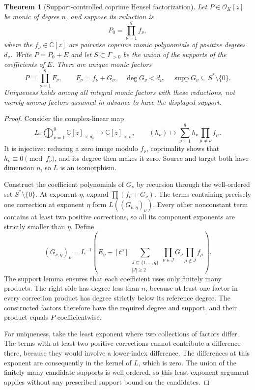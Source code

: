 \documentclass[11pt,letterpaper,oneside]{article}
\numberwithin{equation}{section}
\newtheorem{theorem}{Theorem}[section]
\theoremstyle{definition}
\theoremstyle{remark}\newtheorem{remark}[theorem]{Remark}
\newcommand{\C}{\mathbb C}\newcommand{\R}{\mathbb R}\newcommand{\Q}{\mathbb Q}
\newcommand{\OO}{\mathcal O}\newcommand{\mm}{\mathfrak m}
\newcommand{\supp}{\operatorname{supp}}\newcommand{\st}{\operatorname{st}}
\begin{document}
\begin{theorem}[Support-controlled coprime Hensel factorization]\label{thm:hensel}
Let $P\in\OO_K[z]$ be monic of degree $n$, and suppose its reduction is
\[
 P_0=\prod_{\nu=1}^q f_\nu,
\]
where the $f_\nu\in\C[z]$ are pairwise coprime monic polynomials of
positive degrees $d_\nu$. Write $P=P_0+E$ and let $S\subset\Gamma_{>0}$
be the union of the supports of the coefficients of $E$.
There are unique monic factors
\begin{equation}\label{eq:henselfactors}
 P=\prod_{\nu=1}^q F_\nu,\qquad
 F_\nu=f_\nu+G_\nu,\quad \deg G_\nu<d_\nu,
 \quad \supp G_\nu\subseteq S^*\setminus\{0\}.
\end{equation}
Uniqueness holds among all integral monic factors with these reductions,
not merely among factors assumed in advance to have the displayed support.
\end{theorem}
\begin{proof}
Consider the complex-linear map
\begin{equation}\label{eq:hensellinear}
 L:\bigoplus_{\nu=1}^q\C[z]_{<d_\nu}\longrightarrow\C[z]_{<n},
 \qquad (h_\nu)\longmapsto
 \sum_{\nu=1}^q h_\nu\prod_{\mu\ne\nu}f_\mu.
\end{equation}
It is injective: reducing a zero image modulo $f_\nu$, coprimality shows
that $h_\nu\equiv0\pmod{f_\nu}$, and its degree then makes it zero.
Source and target both have dimension $n$, so $L$ is an isomorphism.

Construct the coefficient polynomials of $G_\nu$ by recursion through the
well-ordered set $S^*\setminus\{0\}$. At exponent $\eta$, expand
$\prod(f_\nu+G_\nu)$. The terms containing precisely one correction
at exponent $\eta$ form $L((G_{\nu,\eta})_\nu)$. Every other nonconstant
term contains at least two positive corrections, so all its component
exponents are strictly smaller than $\eta$. Define
\[
 (G_{\nu,\eta})_\nu
 =L^{-1}\left(E_\eta-
 [t^\eta]\!\sum_{\substack{J\subseteq\{1,\ldots,q\}\\|J|\geq2}}
 \prod_{\nu\in J}G_\nu\prod_{\mu\notin J}f_\mu\right).
\]
The support lemma ensures that each coefficient uses only finitely many
products. The right side has degree less than $n$, because at least one
factor in every correction product has degree strictly below its reference
degree. The constructed factors therefore have the required degree and
support, and their product equals $P$ coefficientwise.

For uniqueness, take the least exponent where two collections of factors
differ. The terms with at least two positive corrections cannot contribute
a difference there, because they would involve a lower-index difference.
The differences at this exponent are consequently in the kernel of $L$,
which is zero. The union of the finitely many candidate supports is well
ordered, so this least-exponent argument applies without any prescribed
support bound on the candidates.
\end{proof}
\end{document}
